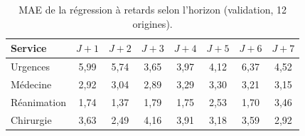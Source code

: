 \begin{table}[H]
    \centering
    \caption{MAE de la régression à retards selon l'horizon (validation, 12 origines).}
    \label{tab:previsions_horizon}
    \small
    \begin{tabular}{lccccccc}
        \toprule
        \textbf{Service} & \textbf{$J+1$} & \textbf{$J+2$} & \textbf{$J+3$} & \textbf{$J+4$} & \textbf{$J+5$} & \textbf{$J+6$} & \textbf{$J+7$} \\
        \midrule
        Urgences & 5{,}99 & 5{,}74 & 3{,}65 & 3{,}97 & 4{,}12 & 6{,}37 & 4{,}52 \\
        Médecine & 2{,}92 & 3{,}04 & 2{,}89 & 3{,}29 & 3{,}30 & 3{,}21 & 3{,}15 \\
        Réanimation & 1{,}74 & 1{,}37 & 1{,}79 & 1{,}75 & 2{,}53 & 1{,}70 & 3{,}46 \\
        Chirurgie & 3{,}63 & 2{,}49 & 4{,}16 & 3{,}91 & 3{,}18 & 3{,}59 & 2{,}92 \\
        \bottomrule
    \end{tabular}
\end{table}
